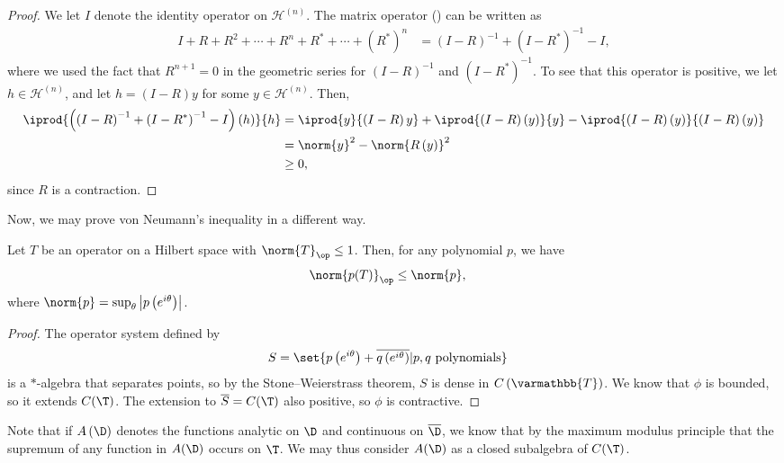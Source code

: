 \documentclass[10pt]{mypackage}
\renewcommand*{\mathbb}[1]{\varmathbb{#1}}
\begin{document}
\begin{proof}
  We let $I$ denote the identity operator on $\mathcal{H}^{(n)}$. The matrix operator (\textasteriskcentered) can be written as
  \begin{align*}
    I + R + R^2 + \cdots + R^{n} + R^{\ast} + \cdots + \left( R^{\ast} \right)^{n} &= \left( I-R \right)^{-1} + \left( I-R^{\ast} \right)^{-1} - I,
  \end{align*}
  where we used the fact that $R^{n+1} = 0$ in the geometric series for $\left( I-R \right)^{-1}$ and $\left( I-R^{\ast} \right)^{-1}$. To see that this operator is positive, we let $h\in \mathcal{H}^{(n)}$, and let $h = \left( I-R \right)y$ for some $y\in \mathcal{H}^{(n)}$. Then,
  \begin{align*}
    \iprod{\left( \left( I-R \right)^{-1} + \left( I-R^{\ast} \right)^{-1} - I \right)\left( h \right)}{h} &= \iprod{y}{\left( I-R \right)y} + \iprod{\left( I-R \right)\left( y \right)}{y} - \iprod{\left( I-R \right)\left( y \right)}{\left( I-R \right)\left( y \right)}\\
                                                                                                           &= \norm{y}^2 - \norm{R\left( y \right)}^2\\
                                                                                                           &\geq 0,
  \end{align*}
  since $R$ is a contraction.
\end{proof}
Now, we may prove von Neumann's inequality in a different way.
\begin{theorem} 
  Let $T$ be an operator on a Hilbert space with $\norm{T}_{\op}\leq 1$. Then, for any polynomial $p$, we have
  \begin{align*}
    \norm{p(T)}_{\op} &\leq \norm{p},
  \end{align*}
  where $\norm{p} = \sup_{\theta} \left\vert p\left( e^{i\theta} \right) \right\vert$.
\end{theorem}
\begin{proof}
  The operator system defined by
  \begin{align*}
    S &= \set{p\left( e^{i\theta} \right) + \overline{q\left( e^{i\theta} \right)} | p,q\text{ polynomials}}
  \end{align*}
  is a $\ast$-algebra that separates points, so by the Stone--Weierstrass theorem, $S$ is dense in $C\left(\mathbb{T}\right)$. We know that $\phi$ is bounded, so it extends $C(\T)$. The extension to $\overline{S} = C(\T)$ also positive, so $\phi$ is contractive.
\end{proof}
Note that if $A\left( \D \right)$ denotes the functions analytic on $\D$ and continuous on $\overline{\D}$, we know that by the maximum modulus principle that the supremum of any function in $A(\D)$ occurs on $\T$. We may thus consider $A(\D)$ as a closed subalgebra of $C(\T)$.\newline
\end{document}
